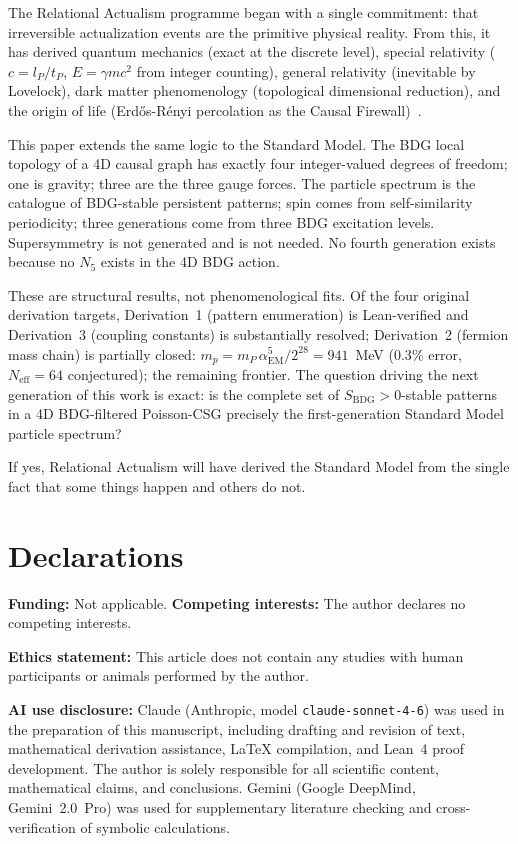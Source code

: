\documentclass[11pt,a4paper]{article}
\newcommand{\SBDG}{S_{\mathrm{BDG}}}
\begin{document}
The Relational Actualism programme began with a single commitment: that
irreversible actualization events are the primitive physical reality. From this,
it has derived quantum mechanics (exact at the discrete level), special
relativity ($c = l_P/t_P$, $E = \gamma mc^2$ from integer counting), general
relativity (inevitable by Lovelock), dark matter phenomenology (topological
dimensional reduction), and the origin of life (Erd\H{o}s-R\'{e}nyi percolation as the Causal Firewall)~\citep{ErdosRenyi1960}.

This paper extends the same logic to the Standard Model. The BDG local
topology of a 4D causal graph has exactly four integer-valued degrees of
freedom; one is gravity; three are the three gauge forces. The particle
spectrum is the catalogue of BDG-stable persistent patterns; spin comes from
self-similarity periodicity; three generations come from three BDG excitation
levels. Supersymmetry is not generated and is not needed. No fourth generation
exists because no $N_5$ exists in the 4D BDG action.

These are structural results, not phenomenological fits. Of the four
original derivation targets, Derivation~1 (pattern enumeration) is
Lean-verified and Derivation~3 (coupling constants) is substantially
resolved; Derivation~2 (fermion mass chain) is partially closed: $m_p = m_P\,\alpha_{\mathrm{EM}}^5/2^{28} = 941$~MeV ($0.3\%$ error, $N_{\mathrm{eff}} = 64$ conjectured); the remaining
frontier. The question driving the next generation of this work is exact:
is the complete set of $\SBDG > 0$-stable patterns in a 4D BDG-filtered
Poisson-CSG precisely the first-generation Standard Model particle spectrum?

If yes, Relational Actualism will have derived the Standard Model from the
single fact that some things happen and others do not.


\section*{Declarations}
\textbf{Funding:} Not applicable.\quad
\textbf{Competing interests:} The author declares no competing interests.

\textbf{Ethics statement:} This article does not contain any studies with human participants or animals performed by the author.

\textbf{AI use disclosure:} Claude (Anthropic, model \texttt{claude-sonnet-4-6}) was used in the preparation of this manuscript, including drafting and revision of text, mathematical derivation assistance, \LaTeX{} compilation, and Lean~4 proof development. The author is solely responsible for all scientific content, mathematical claims, and conclusions. Gemini (Google DeepMind, Gemini~2.0~Pro) was used for supplementary literature checking and cross-verification of symbolic calculations.
\end{document}
